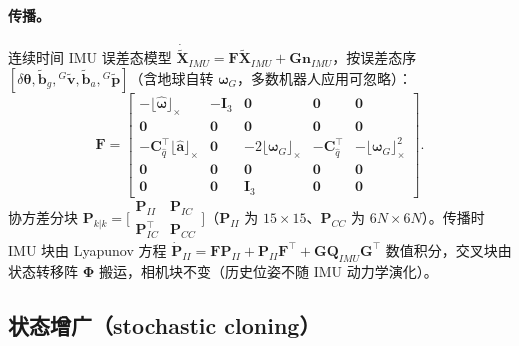 \paragraph{传播。}
连续时间 IMU 误差态模型 $\dot{\tilde{\mathbf{X}}}_{IMU}=\mathbf{F}\tilde{\mathbf{X}}_{IMU}+\mathbf{G}\mathbf{n}_{IMU}$，按误差态序 $[\delta\boldsymbol{\theta},\tilde{\mathbf{b}}_g,{}^G\tilde{\mathbf{v}},\tilde{\mathbf{b}}_a,{}^G\tilde{\mathbf{p}}]$（含地球自转 $\boldsymbol{\omega}_G$，多数机器人应用可忽略）：
\begin{equation}
  \mathbf{F}=\begin{bmatrix}
  -\lfloor\hat{\boldsymbol{\omega}}\rfloor_\times&-\mathbf{I}_3&\mathbf{0}&\mathbf{0}&\mathbf{0}\\
  \mathbf{0}&\mathbf{0}&\mathbf{0}&\mathbf{0}&\mathbf{0}\\
  -\mathbf{C}_{\hat q}^\top\lfloor\hat{\mathbf{a}}\rfloor_\times&\mathbf{0}&-2\lfloor\boldsymbol{\omega}_G\rfloor_\times&-\mathbf{C}_{\hat q}^\top&-\lfloor\boldsymbol{\omega}_G\rfloor_\times^2\\
  \mathbf{0}&\mathbf{0}&\mathbf{0}&\mathbf{0}&\mathbf{0}\\
  \mathbf{0}&\mathbf{0}&\mathbf{I}_3&\mathbf{0}&\mathbf{0}
  \end{bmatrix}.
  \label{eq:vio-msckf-F}
\end{equation}
协方差分块 $\mathbf{P}_{k|k}=\big[\begin{smallmatrix}\mathbf{P}_{II}&\mathbf{P}_{IC}\\ \mathbf{P}_{IC}^\top&\mathbf{P}_{CC}\end{smallmatrix}\big]$（$\mathbf{P}_{II}$ 为 $15\times15$、$\mathbf{P}_{CC}$ 为 $6N\times6N$）。传播时 IMU 块由 Lyapunov 方程 $\dot{\mathbf{P}}_{II}=\mathbf{F}\mathbf{P}_{II}+\mathbf{P}_{II}\mathbf{F}^\top+\mathbf{G}\mathbf{Q}_{IMU}\mathbf{G}^\top$ 数值积分，交叉块由状态转移阵 $\boldsymbol{\Phi}$ 搬运，相机块不变（历史位姿不随 IMU 动力学演化）。

\subsection{状态增广（stochastic cloning）}
\label{sec:vio-msckf-clone}

